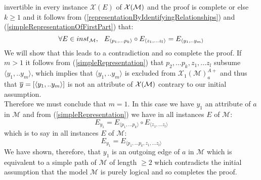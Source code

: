 \documentclass[10pt,a4paper]{article}
\newcommand{\genericmodel}{\mathcal{M}}
\newcommand{\logtophys}{\mathcal{X}}
\newcommand{\chiOne}[1]{{\mathcal{X}_1}(\genericmodel)^{A+}_{#1}}
\begin{document}
invertible in every instance $\logtophys(E)$ of $\genericphysical$ and the proof is complete 
\noindent or else $k \geq 1$ and it follows from (\ref{representationByIdentifyingRelationships}) and (\ref{simpleRepresentationOfFirstPart}) that:
\begin{equation} 
\label{simpleRepresentation}
\ineveryinstance  E_{\langle p_1,...p_k \rangle} \circ E_{\langle z_1,...z_l \rangle} = E_{\langle y_1,..y_m \rangle} 
\end{equation}
\noindent We will show that this leads to a contradiction and so complete the proof. If $m >1$ it follows 
 from  (\ref{simpleRepresentation}) 
that $p_2,...p_k,z_1,...z_l$ subsume $\langle y_1,..y_m \rangle$, 
which implies that $\langle y_1,..y_m \rangle$ is excluded from $\chiOne{a}$ and thus that 
 $\overline{y}=\left[\langle y_1,..y_m \rangle\right]$ is not an attribute of $\genericphysical$ contrary to our 
initial assumption. \\


\noindent Therefore we must conclude that $m=1$.
In this case we have $y_1$ an attribute of $a$ in $\genericmodel$ and from (\ref{simpleRepresentation})  we have in all instances $E$ of $\genericmodel$:
\begin{equation}
E_{y_1}=E_{\langle p_1,...p_k \rangle} \circ E_{\langle z_1,...z_l \rangle}
\end{equation}
\noindent which is to say in all instances $E$ of $\genericmodel$:
\begin{equation}
E_{y_1}=E_{\langle p_1,...p_k ,z_1,...z_l \rangle}
\end{equation}
\noindent
We have shown, therefore, that $y_1$ is an outgoing edge of $a$ in $\genericmodel$ which is equivalent to a simple path of $\genericmodel$ of length $\geq 2$ which contradicts  the 
 initial assumption that the model $\genericmodel$ is purely logical and so completes the proof.
\end{document}

